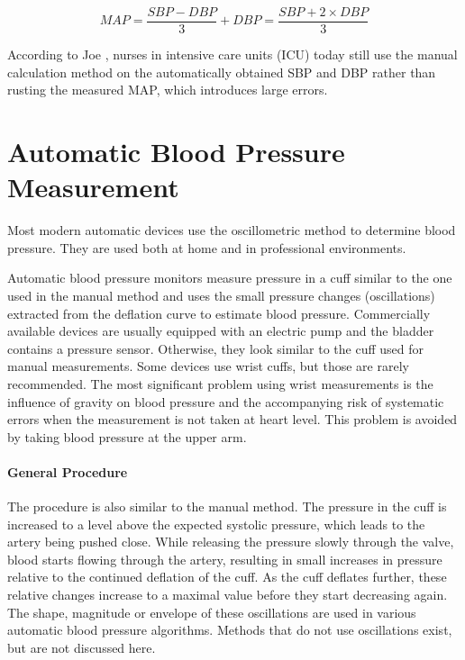 \begin{equation}
\label{eq:MAP}
MAP = \frac{SBP-DBP}{3}+DBP = \frac{SBP+2\times DBP}{3}
\end{equation}

According to Joe \cite{Joe2019}, nurses in intensive care units (ICU) today still use the manual calculation method on the automatically obtained SBP and DBP rather than rusting the measured MAP, which introduces large errors.

\section{Automatic Blood Pressure Measurement}

Most modern automatic devices use the oscillometric method to determine blood pressure. They are used both at home and in professional environments.

Automatic blood pressure monitors measure pressure in a cuff similar to the one used in the manual method and uses the small pressure changes (oscillations) extracted from the deflation curve to estimate blood pressure. Commercially available devices are usually equipped with an electric pump and the bladder contains a pressure sensor. Otherwise, they look similar to the cuff used for manual measurements. Some devices use wrist cuffs, but those are rarely recommended. \cite{BIHS2020} The most significant problem using wrist measurements is the influence of gravity on blood pressure and the accompanying risk of systematic errors when the measurement is not taken at heart level. \cite{Boron2012} This problem is avoided by taking blood pressure at the upper arm.

\paragraph{General Procedure} The procedure is also similar to the manual method. The pressure in the cuff is increased to a level above the expected systolic pressure, which leads to the artery being pushed close. While releasing the pressure slowly through the valve, blood starts flowing through the artery, resulting in small increases in pressure relative to the continued deflation of the cuff. As the cuff deflates further, these relative changes increase to a maximal value before they start decreasing again.\cite{Forouzanfar2015,Drzewiecki1994,Ursino1996} The shape, magnitude or envelope of these oscillations are used in various automatic blood pressure algorithms. Methods that do not use oscillations exist, but are not discussed here.

